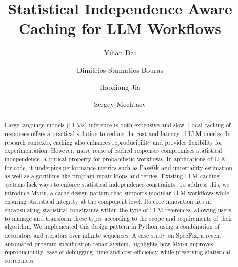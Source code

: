 \documentclass[sigconf]{acmart}
\newcommand{\projName}{\textsc{Mnimi}\xspace}
\begin{document}
\title{Statistical Independence Aware Caching for LLM Workflows}

\author{Yihan Dai}

\author{Dimitrios Stamatios Bouras}

\author{Haoxiang Jia}

\author{Sergey Mechtaev}


\begin{abstract}
Large language models (LLMs) inference is both expensive and slow. Local caching of responses offers a practical solution to reduce the cost and latency of LLM queries. In research contexts, caching also enhances reproducibility and provides flexibility for experimentation. However, naive reuse of cached responses compromises statistical independence, a critical property for probabilistic workflows. In applications of LLM for code, it underpins performance metrics such as Pass@k and uncertainty estimation, as well as algorithms like program repair loops and retries. Existing LLM caching systems lack ways to enforce statistical independence constraints. To address this, we introduce \projName, a cache design pattern that supports modular LLM workflows while ensuring statistical integrity at the component level. Its core innovation lies in encapsulating statistical constraints within the type of LLM references, allowing users to manage and transform these types according to the scope and requirements of their algorithm. We implemented this design pattern in Python using a combination of decorators and iterators over infinite sequences. A case study on SpecFix, a recent automated program specification repair system, highlights how \projName improves reproducibility, ease of debugging, time and cost efficiency while preserving statistical correctness.
\end{abstract}
\end{document}
